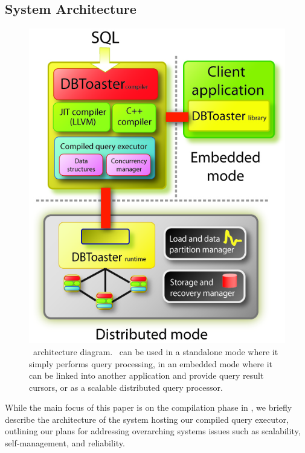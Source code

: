   
\subsection{System Architecture}
\begin{figure}[t]
\begin{center}
\includegraphics[scale=0.45]{figures/overview}
\end{center}
\vspace{-4mm}
\caption{\compiler\ architecture diagram.
\compiler\ can be used in a standalone
mode where it simply performs query processing, in an embedded mode where it can be
linked into another application and provide query result cursors, or as
a scalable distributed query processor.}
\label{fig:overview}
\end{figure}

While the main focus of this paper is on the compilation phase in \compiler, we
briefly describe the architecture of the system hosting our compiled
query executor, outlining our plans for addressing overarching systems issues
such as scalability, self-management, and reliability.

